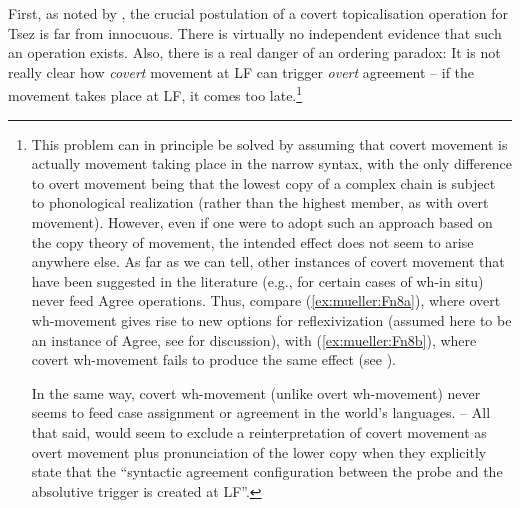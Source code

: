 \documentclass[output=paper
,modfonts
,nonflat]{langsci/langscibook}
\begin{document}
	First, as noted by \cite{Boskovic:07}, the crucial postulation of a
	covert topicalisation operation for Tsez is far from innocuous. There
	is virtually no independent evidence that such an operation
	exists. Also, there is a real danger of an ordering paradox: It is not
	really clear how {\itshape covert} movement at LF can trigger {\itshape overt}
	agreement -- if the movement takes place at LF, it comes too
	late.\footnote{This problem  can in principle be solved by assuming
		that covert movement is actually movement taking place in the
		narrow syntax, with the only difference to overt movement being that
		the lowest copy of a complex chain is subject to phonological
		realization (rather than the highest member, as with overt movement).
		However, even if one were to adopt such an approach based on the copy
		theory of movement, the intended effect does not seem to arise
		anywhere else. As far as we can tell, other instances of covert
		movement that have been suggested in the literature (e.g., for certain
		cases of wh-in situ) never feed Agree operations. Thus, compare (\ref{ex:mueller:Fn8a}),
		where overt wh-movement gives rise to new options for reflexivization
		(assumed here to be an instance of Agree, see \citealt{Reuland:11} for
		discussion), with (\ref{ex:mueller:Fn8b}), where covert wh-movement fails to produce the
		same effect (see \citealt{Barss:86}). 
		
		\ea\label{ex:mueller:Fn8}
		\z
		\z
		In the same way, covert wh-movement (unlike overt wh-movement) never seems to feed case
		assignment or agreement in the world's languages. -- 
		All  that said, \citet[626]{PolinskyPotsdam:01} would seem to 
		exclude a reinterpretation of covert movement as overt movement plus
		pronunciation of the lower copy when they explicitly state that the
		``syntactic agreement configuration between the probe and the
		absolutive trigger is created at LF''.}
	
\end{document}
